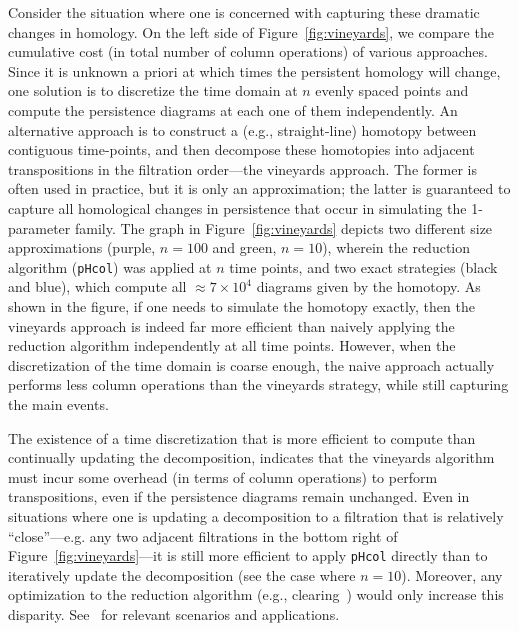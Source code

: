 \documentclass{siamart190516}
\begin{document}
  Consider the situation where one is concerned with capturing these dramatic changes in homology.
  On the left side of Figure~\ref{fig:vineyards}, we compare the cumulative cost (in total number of column operations) of various approaches.
  Since it is unknown a priori at which times  the persistent homology will change, one solution is to discretize the time domain at $n$ evenly spaced points and compute the persistence diagrams at each one of them  independently. 
  An alternative approach is to construct a (e.g., straight-line) homotopy between  contiguous time-points, and then decompose these homotopies into adjacent transpositions in the filtration order---the vineyards approach. The former is often used in practice, but it is only an approximation; the latter is guaranteed to capture all homological changes in persistence that occur in simulating the 1-parameter family. 
  The graph in Figure~\ref{fig:vineyards} depicts two different size approximations (purple, $n=100$ and green, $n=10$), wherein the reduction algorithm (\texttt{pHcol}) was applied at $n$ time points, and two exact strategies (black and blue), which compute all $\approx 7 \times 10^{4}$ diagrams given by the homotopy. 
  As shown in the figure, if one needs to simulate the homotopy exactly, then the vineyards approach is indeed far more efficient than naively applying the reduction algorithm independently at all time points.
  However, when the discretization of the time domain is coarse enough, the naive approach actually performs less column operations than the vineyards strategy, while still capturing the main events. 
  
  The existence of a time discretization that is more efficient to compute than continually updating the decomposition, indicates that the vineyards algorithm must incur some overhead (in terms of column operations) to perform transpositions, even if the persistence diagrams remain unchanged. 
  Even in situations where one is updating a decomposition to a filtration that is  relatively ``close''---e.g. any two adjacent filtrations in the bottom right of Figure~\ref{fig:vineyards}---it is still more efficient to apply \texttt{pHcol} directly than  to iteratively update the decomposition (see the case where $n = 10$). 
 Moreover, any optimization to the reduction algorithm (e.g.,  clearing~\cite{chen2011persistent}) would only increase this disparity.
 See~\cite{topaz2015topological, xian2020capturing, lesnick2015interactive, kim2020spatiotemporal} 
 for relevant scenarios and applications. 
 
\end{document}
